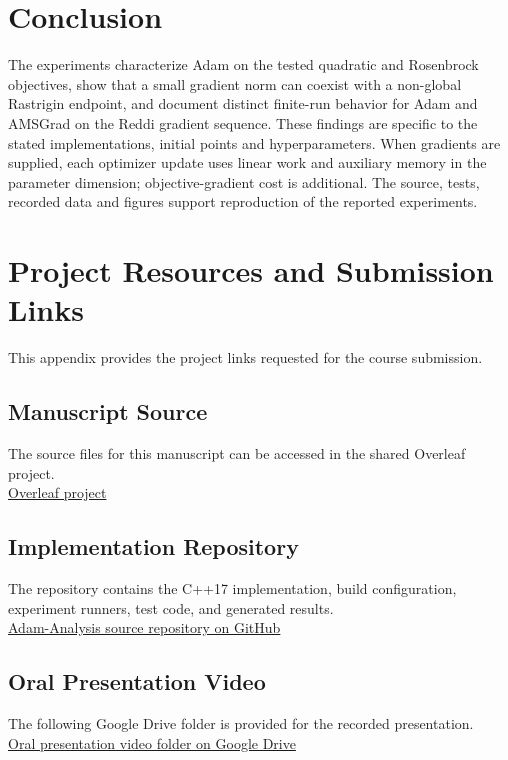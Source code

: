 ﻿\documentclass[conference]{IEEEtran}
\begin{document}
\section{Conclusion}
The experiments characterize Adam on the tested quadratic and Rosenbrock objectives, show that a small gradient norm can coexist with a non-global Rastrigin endpoint, and document distinct finite-run behavior for Adam and AMSGrad on the Reddi gradient sequence. These findings are specific to the stated implementations, initial points and hyperparameters. When gradients are supplied, each optimizer update uses linear work and auxiliary memory in the parameter dimension; objective-gradient cost is additional. The source, tests, recorded data and figures support reproduction of the reported experiments.

\appendices
\section{Project Resources and Submission Links}
This appendix provides the project links requested for the course submission.

\subsection{Manuscript Source}

The source files for this manuscript can be accessed in the shared Overleaf project.\\

\href{https://www.overleaf.com/project/6adbd768cbee7aeb66bcd5f9/share\#1b64dd9bd84fd0003f81626d5a4e47af269068164341fd83}{Overleaf project}
\subsection{Implementation Repository}
The repository contains the C++17 implementation, build configuration, experiment runners, test code, and generated results.\\
\href{https://github.com/darioXxx32/Algorithm-analysis/tree/main/Adam-Analysis}{Adam-Analysis source repository on GitHub}

\subsection{Oral Presentation Video}
The following Google Drive folder is provided for the recorded presentation.\\
\href{https://drive.google.com/drive/folders/1WUl1pRtYdUr3mXK9QRBEN3LEOtXKuQGO?usp=drive_link}{Oral presentation video folder on Google Drive}
\end{document}
